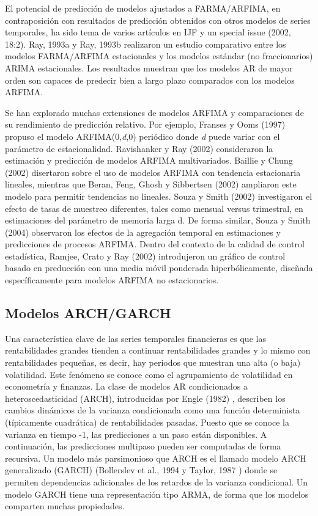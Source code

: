 \documentclass{llncs}
\begin{document}
El potencial de predicción de modelos ajustados a FARMA/ARFIMA, en contraposición con resultados de predicción obtenidos con otros modelos de series temporales, ha sido tema de varios artículos en IJF y un special issue (2002, 18:2). Ray, 1993a \cite{Ray1993255} y Ray, 1993b \cite{Ray1993511} realizaron un estudio comparativo entre los modelos FARMA/ARFIMA estacionales y los modelos estándar (no fraccionarios) ARIMA estacionales. Los resultados muestran que los modelos AR de mayor orden son capaces de predecir bien a largo plazo comparados con los modelos ARFIMA. 

Se han explorado muchas extensiones de modelos ARFIMA y comparaciones de su rendimiento de predicción relativo. Por ejemplo, Franses y Ooms (1997) \cite{Franses1997117} propuso el modelo ARFIMA(0,\emph{d},0) periódico donde \emph{d} puede variar con el parámetro de estacionalidad. Ravishanker y Ray (2002) \cite{Ravishanker2002207} consideraron la estimación y predicción de modelos ARFIMA multivariados. Baillie y Chung (2002) \cite{Baillie2002215} disertaron sobre el uso de modelos ARFIMA con tendencia estacionaria lineales, mientras que Beran, Feng, Ghosh y Sibbertsen (2002) \cite{Beran2002227} ampliaron este modelo para permitir tendencias no lineales. Souza y Smith (2002) investigaron el efecto de tasas de muestreo diferentes, tales como mensual versus trimestral, en estimaciones del parámetro de memoria larga d. De forma similar, Souza y Smith (2004) observaron los efectos de la agregación temporal en estimaciones y predicciones de procesos ARFIMA. Dentro del contexto de la calidad de control estadística, Ramjee, Crato y Ray (2002)\cite{Ramjee2002291} introdujeron un gráfico de control basado en preducción con una media móvil ponderada hiperbólicamente, diseñada específicamente para modelos ARFIMA no estacionarios.


\subsection{Modelos ARCH/GARCH}
Una característica clave de las series temporales financieras es que las rentabilidades grandes tienden a continuar rentabilidades grandes y lo mismo con rentabilidades pequeñas, es decir, hay periodos que muestran una alta (o baja) volatilidad. Este fenómeno se conoce como el agrupamiento de volatilidad en econometría y finanzas. La clase de modelos AR condicionados a heteroscedasticidad (ARCH), introducidas por Engle (1982) \cite{Engle1982987}, describen los cambios dinámicos de la varianza condicionada como una función determinista (típicamente cuadrática) de rentabilidades pasadas. Puesto que se conoce la varianza en tiempo -1, las predicciones a un paso están disponibles. A continuación, las predicciones multipaso pueden ser computadas de forma recursiva. Un modelo más parsimonioso que ARCH es el llamado modelo ARCH generalizado (GARCH) (Bollerslev et al., 1994\cite{Bollerslev19942959} y Taylor, 1987 \cite{Taylor1987159}) donde se permiten dependencias adicionales de los retardos de la varianza condicional. Un modelo GARCH tiene una representación tipo ARMA, de forma que los modelos comparten muchas propiedades.
\end{document}
